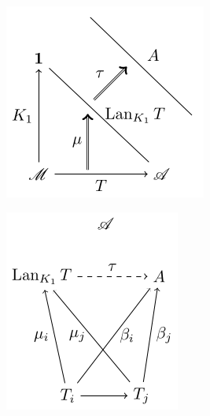 \documentclass[titlepage]{ltjsreport}
\theoremstyle{definition}
\begin{document}
\begin{center}
  \begin{minipage}[b]{0.4\linewidth}
    \includegraphics{src/colim-left-kan-1}
  \end{minipage}
  \begin{minipage}[b]{0.4\linewidth}
    \includegraphics{src/colim-left-kan-2}
  \end{minipage}
\end{center}
\end{document}

